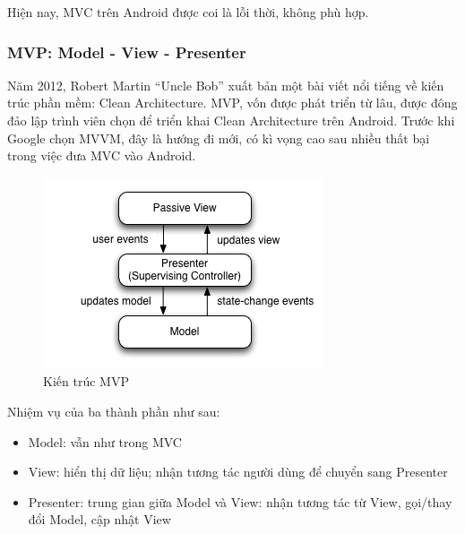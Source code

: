 \documentclass[../../thesis]{subfiles}
\begin{document}
Hiện nay, MVC trên Android được coi là lỗi thời, không phù hợp.

\subsubsection{MVP: Model - View - Presenter}

Năm 2012, Robert Martin ``Uncle Bob'' xuất bản một bài viết nổi tiếng về kiến
trúc phần mềm: Clean Architecture. MVP, vốn được phát triển từ lâu, được đông
đảo lập trình viên chọn để triển khai Clean Architecture trên Android. Trước khi
Google chọn MVVM, đây là hướng đi mới, có kì vọng cao sau nhiều thất bại trong
việc đưa MVC vào Android.

\begin{figure}
    \centering
    \vspace*{-3mm}
    \includegraphics[width=\linewidth]{../images/Model_View_Presenter_GUI_Design_Pattern.png}
    \vspace*{-10mm}
    \caption{Kiến trúc MVP \cite{WIKI_MVP}}
    \label{fig:mvp}
\end{figure}

Nhiệm vụ của ba thành phần như sau:

\begin{itemize}
    \item
        Model: vẫn như trong MVC
    \item
        View: hiển thị dữ liệu; nhận tương tác người dùng để chuyển sang
        Presenter
    \item
        Presenter: trung gian giữa Model và View: nhận tương tác từ View,
        gọi/thay đổi Model, cập nhật View
\end{itemize}
\end{document}
